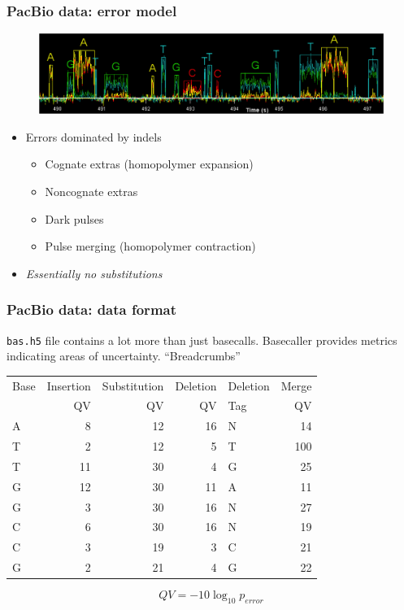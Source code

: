 \documentclass[serif,11pt]{beamer}
\begin{document}
\begin{frame}
\frametitle{PacBio data: error model}
\label{sec-3-6}

   \begin{figure}
   \centering
     \includegraphics[width=4.5in]{img/trace.png}
   \end{figure}

\begin{itemize}
\item Errors dominated by indels
\begin{itemize}
\item Cognate extras (homopolymer expansion)
\item Noncognate extras
\item Dark pulses
\item Pulse merging (homopolymer contraction)
\end{itemize}
\item \emph{Essentially no substitutions}
\end{itemize}
\end{frame}
\begin{frame}[fragile]
\frametitle{PacBio data: data format}
\label{sec-3-7}

   \verb~bas.h5~ file contains a lot more than just basecalls.  Basecaller
   provides metrics indicating areas of uncertainty.  ``Breadcrumbs''


\begin{center}
\begin{tabular}{lrrrlr}
 Base  &  Insertion  &  Substitution  &  Deletion  &  Deletion  &  Merge  \\
       &         QV  &            QV  &        QV  &  Tag       &     QV  \\
\hline
 A     &          8  &            12  &        16  &  N         &     14  \\
 T     &          2  &            12  &         5  &  T         &    100  \\
 T     &         11  &            30  &         4  &  G         &     25  \\
 G     &         12  &            30  &        11  &  A         &     11  \\
 G     &          3  &            30  &        16  &  N         &     27  \\
 C     &          6  &            30  &        16  &  N         &     19  \\
 C     &          3  &            19  &         3  &  C         &     21  \\
 G     &          2  &            21  &         4  &  G         &     22  \\
\end{tabular}
\end{center}



   $$QV = -10 \log_{10} p_{error}$$
\end{frame}
\end{document}

